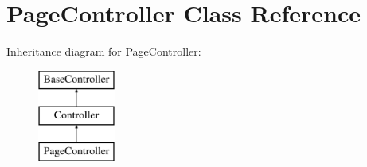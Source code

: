 \hypertarget{class_responsive_1_1_http_1_1_controllers_1_1_page_controller}{}\section{Page\+Controller Class Reference}
\label{class_responsive_1_1_http_1_1_controllers_1_1_page_controller}
Inheritance diagram for Page\+Controller\+:\begin{figure}[H]
\begin{center}
\leavevmode
\includegraphics[height=3.000000cm]{class_responsive_1_1_http_1_1_controllers_1_1_page_controller}
\end{center}
\end{figure}
